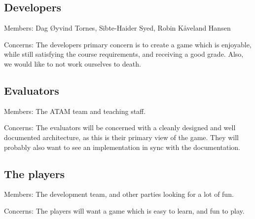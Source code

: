 \subsection{Developers}
Members:  Dag Øyvind Tornes, Sibte-Haider Syed, Robin Kåveland Hansen

Concerns: The developers primary concern is to create a game which is 
enjoyable, while still satisfying the course requirements, and receiving a
good grade.  Also, we would like to not work ourselves to death.

\subsection{Evaluators}
Members:  The ATAM team and teaching staff.

Concerns: The evaluators will be concerned with a cleanly designed and well
documented architecture, as this is their primary view of the game.  They will
probably also want to see an implementation in sync with the documentation.

\subsection{The players}
Members:  The development team, and other parties looking for a lot of fun.

Concerns:  The players will want a game which is easy to learn, and fun to
play.  